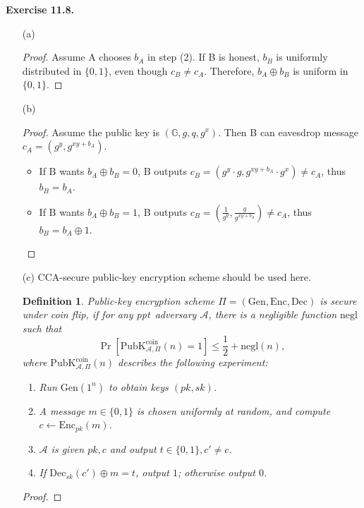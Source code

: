 \documentclass[a4paper]{article}
\newtheorem{definition}{Definition}
\newtheorem*{proof}{Proof}
\newenvironment{exercise}[1]{
	\par
	\noindent\textbf{Exercise #1.}\quad
}{
	\par
	\bigskip
}
\newcommand{\pbra}[1]{\left( #1 \right)}
\newcommand{\sbra}[1]{\left[ #1 \right]}
\newcommand{\bin}{\{0,1\}}
\newcommand{\Enc}{\mathrm{Enc}}
\newcommand{\Gen}{\mathrm{Gen}}
\newcommand{\Dec}{\mathrm{Dec}}
\newcommand{\PubK}{\mathrm{PubK}}
\newcommand{\negl}{\mathrm{negl}}
\newcommand{\ppt}{{\sc ppt}~}
\newcommand{\Acal}{\mathcal{A}}
\newcommand{\Gset}{\mathbb{G}}
\begin{document}
\begin{exercise}{11.8}
\begin{itemize}
    \item[(a)] 
        \begin{proof}
            Assume A chooses $b_A$ in step (2). If B is honest, $b_B$ is uniformly distributed in $\bin$, even though
            $c_B\neq c_A$. Therefore, $b_A\oplus b_B$ is uniform in $\bin$.
        \end{proof}
    \item[(b)]
        \begin{proof}
            Assume the public key is $(\Gset,g,q,g^x)$. 
            Then B can eavesdrop message $c_A=(g^y,g^{xy+b_A})$.
            \begin{itemize}
                \item If B wants $b_A\oplus b_B=0$, B outputs $c_B=(g^y\cdot g,g^{xy+b_A}\cdot g^x)\neq c_A$, thus
                    $b_B=b_A$.
                \item If B wants $b_A\oplus b_B=1$, B outputs $c_B=\pbra{\frac{1}{g^y},\frac{g}{g^{xy+b_A}}}\neq c_A$,
                    thus $b_B=b_A\oplus 1$.
            \end{itemize}
        \end{proof}
    \item[(c)] CCA-secure public-key encryption scheme should be used here.
        \begin{definition}
            Public-key encryption scheme $\Pi=(\Gen,\Enc,\Dec)$ is \emph{secure under coin flip}, if for any
            \ppt adversary $\Acal$, there is a negligible function $\negl$ such that 
            $$
            \Pr\sbra{\PubK^{\mathrm{coin}}_{\Acal,\Pi}(n)=1}\leq\frac12+\negl(n),
            $$
            where $\PubK_{\Acal,\Pi}^{\mathrm{coin}}(n)$ describes the following experiment:
            \begin{enumerate}
                \item Run $\Gen(1^n)$ to obtain keys $(pk,sk)$.
                \item A message $m\in\bin$ is chosen uniformly at random, and compute $c\gets \Enc_{pk}(m)$.
                \item $\Acal$ is given $pk,c$ and output $t\in\bin,c'\neq c$.
                \item If $\Dec_{sk}(c')\oplus m=t$, output $1$; otherwise output $0$.
            \end{enumerate}
        \end{definition}
        \begin{proof}

\end{proof}
\end{itemize}
\end{exercise}
\end{document}
